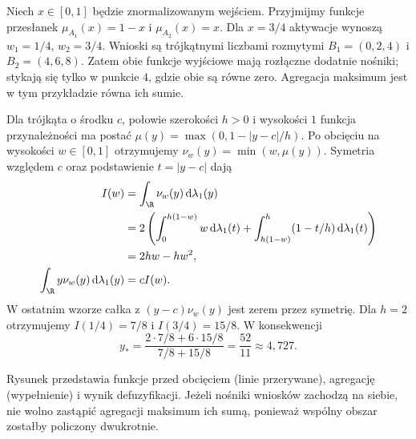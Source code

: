 \begin{przyklad}
\label{ex:lst-fuzzy-mamdani-centroid}
Niech $x\in[0,1]$ będzie znormalizowanym wejściem.
Przyjmijmy funkcje przesłanek $\mu_{A_1}(x)=1-x$
i $\mu_{A_2}(x)=x$. Dla $x=3/4$ aktywacje wynoszą
$w_1=1/4$, $w_2=3/4$.
Wnioski są trójkątnymi liczbami rozmytymi
$B_1=(0,2,4)$ i $B_2=(4,6,8)$.
Zatem obie funkcje wyjściowe mają rozłączne dodatnie
nośniki; stykają się tylko w punkcie $4$, gdzie obie
są równe zero. Agregacja maksimum jest w tym przykładzie
równa ich sumie.

Dla trójkąta o środku $c$, połowie szerokości $h>0$
i wysokości $1$ funkcja przynależności ma postać
$\mu(y)=\max(0,1-|y-c|/h)$.
Po obcięciu na wysokości $w\in[0,1]$ otrzymujemy
$\nu_w(y)=\min(w,\mu(y))$. Symetria względem $c$
oraz podstawienie $t=|y-c|$ dają
\[
\begin{split}
 I(w)&=\int_\R\nu_w(y)\,\mathrm d\lambda_1(y)\\
 &=2\left(\int_0^{h(1-w)}w\,\mathrm d\lambda_1(t)
 +\int_{h(1-w)}^h(1-t/h)\,\mathrm d\lambda_1(t)\right)\\
 &=2h w-hw^2,\\
 \int_\R y\nu_w(y)\,\mathrm d\lambda_1(y)&=cI(w).
\end{split}
\]
W ostatnim wzorze całka z $(y-c)\nu_w(y)$ jest zerem
przez symetrię. Dla $h=2$ otrzymujemy
$I(1/4)=7/8$ i $I(3/4)=15/8$. W konsekwencji
\[
 y_*=\frac{2\cdot7/8+6\cdot15/8}{7/8+15/8}
 =\frac{52}{11}\approx4{,}727.
\]
\begin{center}
\end{center}
Rysunek przedstawia funkcje przed obcięciem (linie
przerywane), agregację (wypełnienie) i wynik defuzyfikacji.
Jeżeli nośniki wniosków zachodzą na siebie, nie wolno
zastąpić agregacji maksimum ich sumą, ponieważ
wspólny obszar zostałby policzony dwukrotnie.
\end{przyklad}

